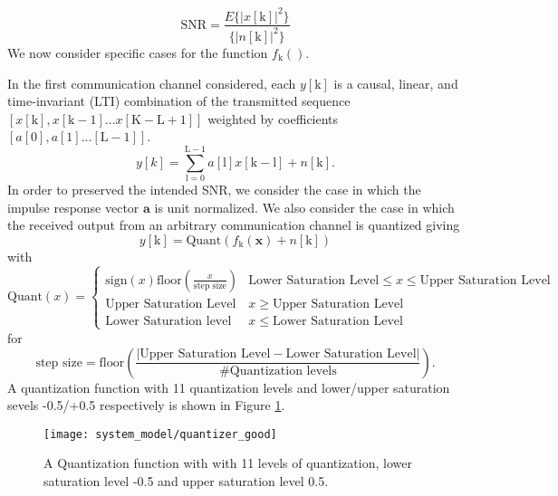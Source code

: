 \begin{equation*}
\text{SNR} = \frac{E\{|x[\text{k}]|^2\}}{\{|n[\text{k}]|^2\}}
\end{equation*}
	We now consider specific cases for the function $f_{\text{k}}()$. 
	\par
In the first communication channel considered, each $y[\text{k}]$ is a causal, linear, and time-invariant (LTI) combination of the transmitted sequence $[x[\text{k}], x[\text{k}-1]... x[\text{K}-\text{L}+1]]$ weighted by coefficients $[a[0], a[1].. . [\text{L}-1]]$. 
\begin{equation}\label{lti_channel}
y[k] = \sum_{\mathrm{\text{l}=0}}^{\mathrm{\text{L}-1}} a[\text{l}]x[\text{k}-\text{l}]+ n[\text{k}].
\end{equation}
In order to preserved the intended SNR, we consider the case in which the impulse response vector $\mathbf{a}$ is unit normalized.
We also consider the case in which the received output from an arbitrary communication channel is quantized giving
\begin{equation}\label{lti_quantized_channel}
y[\text{k}] = \text{Quant}(f_{\text{k}}(\mathbf{x}) + n[\text{k}])
\end{equation}
 with
\[\text{Quant}(x) = 
\begin{cases}
\text{sign}(x)\text{floor}(\frac{x}{\text{step size}})& \text{Lower Saturation Level} \leq x \leq \text{Upper Saturation Level}\\
\text{Upper Saturation Level} & x \geq \text{Upper Saturation Level}\\
\text{Lower Saturation level} & x \leq \text{Lower Saturation Level}
\end{cases}
\]
 for 
 \begin{equation*}
  \text{step size} =\text{floor}\left(\frac{|\text{Upper Saturation Level}- \text{Lower Saturation Level}|}{\text{\# Quantization levels}}\right).
 \end{equation*} A quantization function with 11 quantization levels and lower/upper saturation sevels -0.5/+0.5 respectively is shown in Figure \ref{fig:Quantized Overlay}.
 
 \begin{figure}[H]
\centering
	\texttt{[image: system\_model/quantizer\_good]}
			  \caption{A Quantization function with with 11 levels of quantization, lower saturation level -0.5 and upper saturation level 0.5. }
	  \label{fig:Quantized Overlay}
\end{figure}

